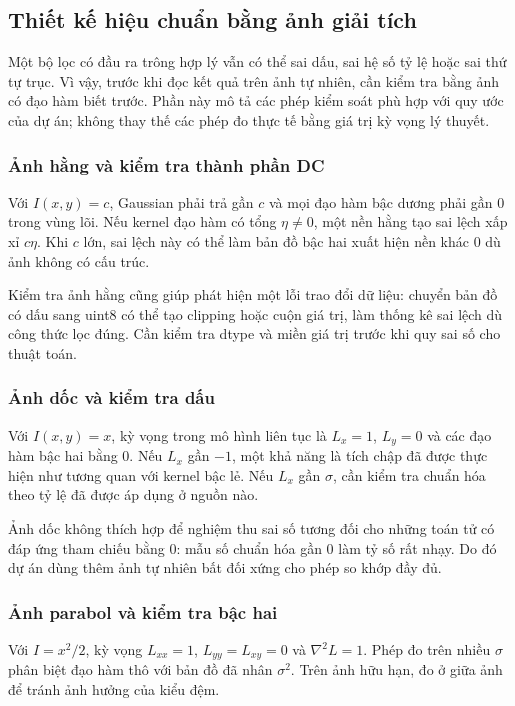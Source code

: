 \subsection{Thiết kế hiệu chuẩn bằng ảnh giải tích}
Một bộ lọc có đầu ra trông hợp lý vẫn có thể sai dấu, sai hệ số tỷ lệ hoặc sai thứ tự trục. Vì vậy, trước khi đọc kết quả trên ảnh tự nhiên, cần kiểm tra bằng ảnh có đạo hàm biết trước. Phần này mô tả các phép kiểm soát phù hợp với quy ước của dự án; không thay thế các phép đo thực tế bằng giá trị kỳ vọng lý thuyết.

\subsubsection{Ảnh hằng và kiểm tra thành phần DC}
Với $I(x,y)=c$, Gaussian phải trả gần $c$ và mọi đạo hàm bậc dương phải gần 0 trong vùng lõi. Nếu kernel đạo hàm có tổng $\eta\neq0$, một nền hằng tạo sai lệch xấp xỉ $c\eta$. Khi $c$ lớn, sai lệch này có thể làm bản đồ bậc hai xuất hiện nền khác 0 dù ảnh không có cấu trúc.

Kiểm tra ảnh hằng cũng giúp phát hiện một lỗi trao đổi dữ liệu: chuyển bản đồ có dấu sang uint8 có thể tạo clipping hoặc cuộn giá trị, làm thống kê sai lệch dù công thức lọc đúng. Cần kiểm tra dtype và miền giá trị trước khi quy sai số cho thuật toán.

\subsubsection{Ảnh dốc và kiểm tra dấu}
Với $I(x,y)=x$, kỳ vọng trong mô hình liên tục là $L_x=1$, $L_y=0$ và các đạo hàm bậc hai bằng 0. Nếu $L_x$ gần $-1$, một khả năng là tích chập đã được thực hiện như tương quan với kernel bậc lẻ. Nếu $L_x$ gần $\sigma$, cần kiểm tra chuẩn hóa theo tỷ lệ đã được áp dụng ở nguồn nào.

Ảnh dốc không thích hợp để nghiệm thu sai số tương đối cho những toán tử có đáp ứng tham chiếu bằng 0: mẫu số chuẩn hóa gần 0 làm tỷ số rất nhạy. Do đó dự án dùng thêm ảnh tự nhiên bất đối xứng cho phép so khớp đầy đủ.

\subsubsection{Ảnh parabol và kiểm tra bậc hai}
Với $I=x^2/2$, kỳ vọng $L_{xx}=1$, $L_{yy}=L_{xy}=0$ và $\nabla^2L=1$. Phép đo trên nhiều $\sigma$ phân biệt đạo hàm thô với bản đồ đã nhân $\sigma^2$. Trên ảnh hữu hạn, đo ở giữa ảnh để tránh ảnh hưởng của kiểu đệm.

